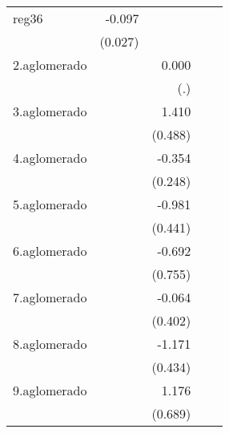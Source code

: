 {\begin{longtable}{l*{4}{D{.}{.}{-1}}}
\addlinespace
reg36       &      -0.097\sym{***}&                     &                     &                     \\
            &     (0.027)         &                     &                     &                     \\
\addlinespace
2.aglomerado&                     &       0.000         &                     &                     \\
            &                     &         (.)         &                     &                     \\
\addlinespace
3.aglomerado&                     &       1.410\sym{**} &                     &                     \\
            &                     &     (0.488)         &                     &                     \\
\addlinespace
4.aglomerado&                     &      -0.354         &                     &                     \\
            &                     &     (0.248)         &                     &                     \\
\addlinespace
5.aglomerado&                     &      -0.981\sym{*}  &                     &                     \\
            &                     &     (0.441)         &                     &                     \\
\addlinespace
6.aglomerado&                     &      -0.692         &                     &                     \\
            &                     &     (0.755)         &                     &                     \\
\addlinespace
7.aglomerado&                     &      -0.064         &                     &                     \\
            &                     &     (0.402)         &                     &                     \\
\addlinespace
8.aglomerado&                     &      -1.171\sym{**} &                     &                     \\
            &                     &     (0.434)         &                     &                     \\
\addlinespace
9.aglomerado&                     &       1.176         &                     &                     \\
            &                     &     (0.689)         &                     &                     \\

\end{longtable}}
